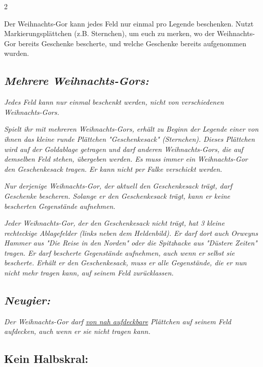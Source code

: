 \documentclass[10pt, a4paper, oneside]{book}
\newcommand{\fan}[1]{\textit{#1}}
\begin{document}
\begin{multicols*}{2}
\begin{nobgcolor}
Der Weihnachts-Gor kann jedes Feld nur einmal pro Legende beschenken. Nutzt Markierungsplättchen (z.B. Sternchen), um euch zu merken, wo der Weihnachts-Gor bereits Geschenke bescherte, und welche Geschenke bereits aufgenommen wurden.






\subsection{\fan{Mehrere Weihnachts-Gors:}}

\fan{Jedes Feld kann nur einmal beschenkt werden, nicht von verschiedenen Weihnachts-Gors.}


\fan{Spielt ihr mit mehreren Weihnachts-Gors, erhält zu Beginn der Legende einer von ihnen das kleine runde Plättchen "Geschenkesack" (Sternchen). Dieses Plättchen wird auf der Goldablage getragen und darf anderen Weihnachts-Gors, die auf demselben Feld stehen, übergeben werden. Es muss immer ein Weihnachts-Gor den Geschenkesack tragen. Er kann nicht per Falke verschickt werden.}

\fan{Nur derjenige Weihnachts-Gor, der aktuell den Geschenkesack trägt, darf Geschenke bescheren. Solange er den Geschenkesack trägt, kann er keine bescherten Gegenstände aufnehmen.}

\fan{Jeder Weihnachts-Gor, der den Geschenkesack nicht trägt, hat 3 kleine rechteckige Ablagefelder (links neben dem Heldenbild). Er darf dort auch Orweyns Hammer aus "Die Reise in den Norden" oder die Spitzhacke aus "Düstere Zeiten" tragen. Er darf bescherte Gegenstände aufnehmen, auch wenn er selbst sie bescherte. Erhält er den Geschenkesack, muss er alle Gegenstände, die er nun nicht mehr tragen kann, auf seinem Feld zurücklassen.}


\columnbreak


\subsection{\fan{Neugier:}}

\fan{Der Weihnachts-Gor darf \hyperref[Aufdecken]{von nah aufdeckbare} Plättchen auf seinem Feld aufdecken, auch wenn er sie nicht tragen kann.}





\subsection{Kein Halbskral:}


\end{nobgcolor}
\end{multicols*}
\end{document}

